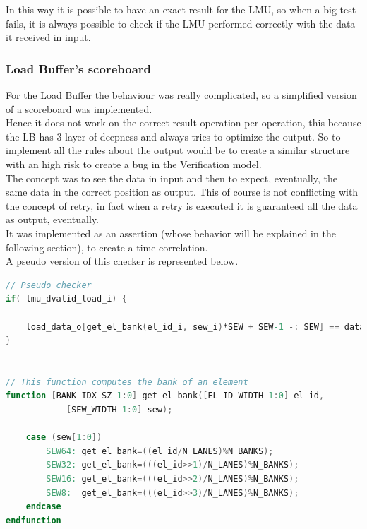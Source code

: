 In this way it is possible to have an exact result for the LMU, so when a big test fails, it is always possible to check if the LMU performed correctly with the data it received in input.\\

\subsubsection{Load Buffer's scoreboard}
For the Load Buffer the behaviour was really complicated, so a simplified  version of a scoreboard was implemented.\\

Hence it does not work on the correct result operation per operation, this because the LB has 3 layer of deepness and always tries to optimize the output. So to implement all the rules about the output would be to create a similar structure with an high risk to create a bug in the Verification model.\\

The concept was to see the data in input and then to expect, eventually, the same data in the correct position as output. This of course is not conflicting with the concept of retry, in fact when a retry is executed it is guaranteed all the data as output, eventually.\\

It was implemented as an assertion (whose behavior will be explained in the following section), to create a time correlation.\\

A pseudo version of this checker is represented below.
\bigskip

\linespread{1}

\begin{lstlisting}[language=Verilog,style=verilog-style, backgroundcolor=\color{lyel_palette}, frame=tlb]
// Pseudo checker
if( lmu_dvalid_load_i) { 

    load_data_o[get_el_bank(el_id_i, sew_i)*SEW + SEW-1 -: SEW] == data_i;
}


// This function computes the bank of an element
function [BANK_IDX_SZ-1:0] get_el_bank([EL_ID_WIDTH-1:0] el_id,
            [SEW_WIDTH-1:0] sew);
            
    case (sew[1:0])
        SEW64: get_el_bank=((el_id/N_LANES)%N_BANKS); 
        SEW32: get_el_bank=(((el_id>>1)/N_LANES)%N_BANKS); 
        SEW16: get_el_bank=(((el_id>>2)/N_LANES)%N_BANKS); 
        SEW8:  get_el_bank=(((el_id>>3)/N_LANES)%N_BANKS); 
    endcase
endfunction

\end{lstlisting}

